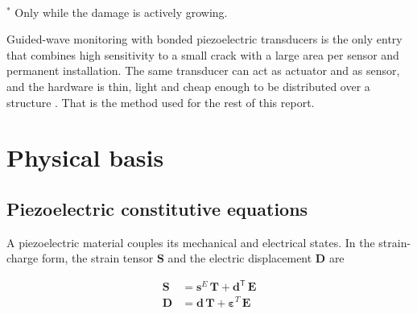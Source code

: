 \begin{table}[H]
\centering
\caption{Comparison of the main SHM method families for thin metallic panels.}
\\[4pt]
{\small $^{*}$ Only while the damage is actively growing.}
\label{tab:compare}
\end{table}

Guided-wave monitoring with bonded piezoelectric transducers is the only entry that combines high
sensitivity to a small crack with a large area per sensor and permanent installation. The same transducer can
act as actuator and as sensor, and the hardware is thin, light and cheap enough to be distributed over a
structure \cite{Qing2019,Ju2023}. That is the method used for the rest of this report.

\section{Physical basis}
\label{sec:physics}

\subsection{Piezoelectric constitutive equations}

A piezoelectric material couples its mechanical and electrical states. In the strain-charge form, the strain
tensor $\mathbf{S}$ and the electric displacement $\mathbf{D}$ are

\begin{align}
  \mathbf{S} &= \mathbf{s}^{E}\,\mathbf{T} + \mathbf{d}^{\mathsf{T}}\,\mathbf{E} \\
  \mathbf{D} &= \mathbf{d}\,\mathbf{T} + \boldsymbol{\varepsilon}^{T}\,\mathbf{E}
\end{align}

